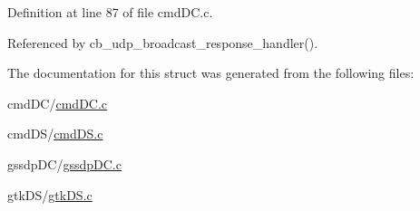 Definition at line 87 of file cmd\+D\+C.\+c.



Referenced by cb\+\_\+udp\+\_\+broadcast\+\_\+response\+\_\+handler().



The documentation for this struct was generated from the following files\+:\begin{DoxyCompactItemize}
\item 
cmd\+D\+C/\hyperlink{cmd_d_c_8c}{cmd\+D\+C.\+c}\item 
cmd\+D\+S/\hyperlink{cmd_d_s_8c}{cmd\+D\+S.\+c}\item 
gssdp\+D\+C/\hyperlink{gssdp_d_c_8c}{gssdp\+D\+C.\+c}\item 
gtk\+D\+S/\hyperlink{gtk_d_s_8c}{gtk\+D\+S.\+c}\end{DoxyCompactItemize}
